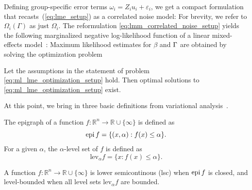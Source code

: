  
Defining group-specific error terms $\omega_i = Z_i u_i + \varepsilon_i$, we get a compact formulation that 
recasts~(\ref{eq:lme_setup}) as a correlated noise model:
For brevity, we refer to $\Omega_i(\Gamma)$ as just $\Omega_i$.
The reformulation \eqref{eq:lmm_correlated_noise_setup}
yields the following marginalized  negative log-likelihood function of a linear mixed-effects model~\citep{Patterson1971}:
Maximum likelihood estimates for $\beta$ and $\Gamma$ are obtained by
solving the optimization problem

\begin{theorem}\label{thm:basic existence}
Let the assumptions in the statement of problem \eqref{eq:ml_lme_optimization_setup} hold. Then optimal solutions to
\eqref{eq:ml_lme_optimization_setup} exist.
\end{theorem}

At this point, we bring in three basic definitions from variational analysis~\cite{rockafellar2009variational}. 

\begin{definition}
The epigraph of a function $f:\mathbb{R}^n\rightarrow \mathbb{R} \cup \{\infty\}$ is defined as
\[
\operatorname{epi} f = \{(x,\alpha) : f(x) \leq \alpha\}. 
\]
For a given $\alpha$, the $\alpha$-level set of $f$ is defined as
\[
\text{lev}_\alpha f = \{x: f(x) \leq \alpha\}.
\] 
\end{definition}

\begin{definition}
A function $f:\mathbb{R}^n\rightarrow \mathbb{R} \cup \{\infty\}$ is lower semicontinous (lsc) when $\operatorname{epi} f$ is closed, 
and level-bounded when all level sets $\text{lev}_\alpha f$ are bounded.  
\end{definition}

